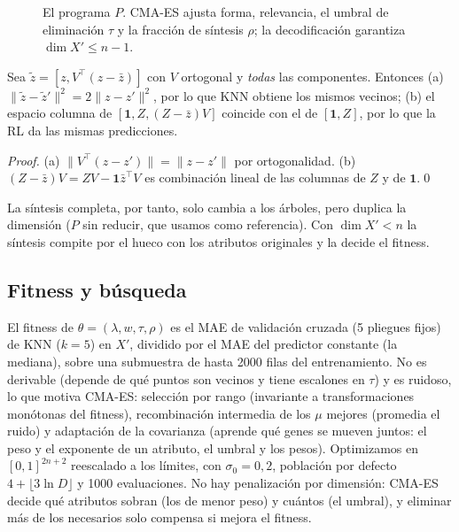 \documentclass[runningheads]{llncs}
\begin{document}
\begin{figure}[t]\centering{}

\caption{El programa $P$. CMA-ES ajusta forma, relevancia, el umbral de eliminación $\tau$ y la fracción de síntesis
$\rho$; la decodificación garantiza $\dim X'\le n-1$.}
\label{fig:esquema}
\end{figure}

\begin{proposition}
Sea $\tilde z=[z,V^\top(z-\bar z)]$ con $V$ ortogonal y \emph{todas} las componentes. Entonces (a)
$\lVert\tilde z-\tilde z'\rVert^2=2\lVert z-z'\rVert^2$, por lo que KNN obtiene los mismos vecinos; (b) el espacio
columna de $[\mathbf 1, Z, (Z-\bar z)V]$ coincide con el de $[\mathbf 1,Z]$, por lo que la RL da las mismas
predicciones.
\end{proposition}
\begin{proof}
(a) $\lVert V^\top(z-z')\rVert=\lVert z-z'\rVert$ por ortogonalidad. (b) $(Z-\bar z)V=ZV-\mathbf 1\bar z^\top V$ es
combinación lineal de las columnas de $Z$ y de $\mathbf 1$.\qed
\end{proof}
La síntesis completa, por tanto, solo cambia a los árboles, pero duplica la dimensión ($P$ sin reducir, que usamos
como referencia). Con $\dim X'<n$ la síntesis compite por el hueco con los atributos originales y la decide el
fitness.

\subsection{Fitness y búsqueda}
El fitness de $\theta=(\lambda,w,\tau,\rho)$ es el MAE de validación cruzada (5 pliegues fijos) de KNN ($k=5$) en
$X'$, dividido por el MAE del predictor constante (la mediana), sobre una submuestra de hasta 2000 filas del
entrenamiento. No es derivable (depende de qué puntos son vecinos y tiene escalones en $\tau$) y es ruidoso, lo que
motiva CMA-ES: selección por rango (invariante a transformaciones monótonas del fitness), recombinación intermedia
de los $\mu$ mejores (promedia el ruido) y adaptación de la covarianza (aprende qué genes se mueven juntos: el peso y
el exponente de un atributo, el umbral y los pesos). Optimizamos en $[0,1]^{2n+2}$ reescalado a los límites, con
$\sigma_0=0{,}2$, población por defecto $4+\lfloor3\ln D\rfloor$ y 1000 evaluaciones. No hay penalización por
dimensión: CMA-ES decide qué atributos sobran (los de menor peso) y cuántos (el umbral), y eliminar más de los
necesarios solo compensa si mejora el fitness.
\end{document}
